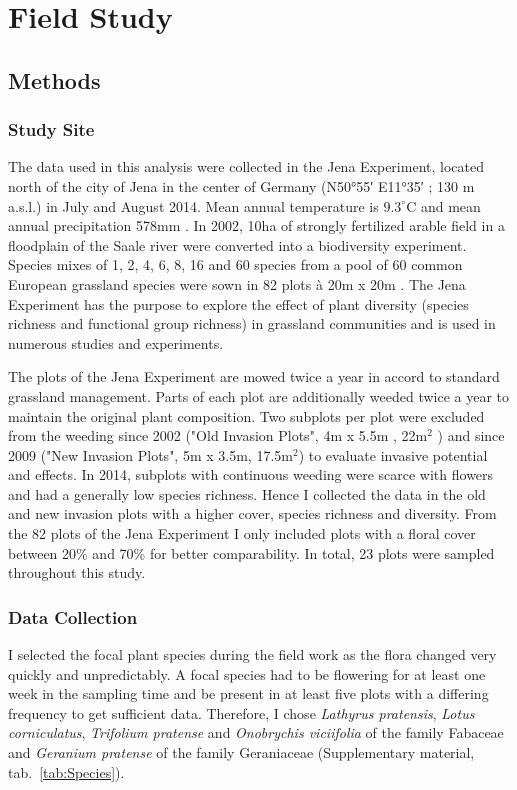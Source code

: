 \label{ch:methods}

\section{Field Study} 

\subsection{Methods}

\subsubsection*{Study Site}
The data used in this analysis were collected in the Jena Experiment, located north of the city of Jena in the center of Germany (N\ang{50;55;} E\ang{11;35;} ; 130 m a.s.l.) in July and August 2014. Mean annual temperature is $9.3 ^\circ\text{C}$ and mean annual precipitation 578mm \citep{kluge2000klima}. In 2002, 10ha of strongly fertilized arable field in a floodplain of the Saale river were converted into a biodiversity experiment. Species mixes of 1, 2, 4, 6, 8, 16 and 60 species from a pool of 60 common European grassland species were sown in 82 plots 	\`{a}  20m x 20m \citep{roscher2004role}.  The Jena Experiment has the purpose to explore the effect of plant diversity (species richness and functional group richness) in grassland communities and is used in numerous studies and experiments.

The plots of the Jena Experiment are mowed twice a year in accord to standard grassland management. Parts of each plot are additionally weeded twice a year to maintain the original plant composition. Two subplots per plot were excluded from the weeding since 2002 ("Old Invasion Plots", 4m x 5.5m , 22m$^{2}$ ) and since 2009 ("New Invasion Plots", 5m x 3.5m, 17.5m$^{2}$) to evaluate invasive potential and effects. In 2014, subplots with continuous weeding were scarce with flowers and had a generally low species richness. Hence I collected the data in the old and new invasion plots with a higher cover, species richness and diversity. From the 82 plots of the Jena Experiment I only included plots with a floral cover between 20\% and 70\% for better comparability. In total, 23 plots were sampled throughout this study. 

\subsubsection*{Data Collection}
I selected the focal plant species during the field work as the flora changed very quickly and unpredictably. A focal species had to be flowering for at least one week in the sampling time and be present in at least five plots with a differing frequency to get sufficient data. Therefore, I chose \textit{Lathyrus pratensis}, \textit{Lotus corniculatus}, \textit{Trifolium pratense} and \textit{Onobrychis viciifolia} of the family Fabaceae and \textit{Geranium pratense} of the family Geraniaceae (Supplementary material, tab.~\ref{tab:Species}).

